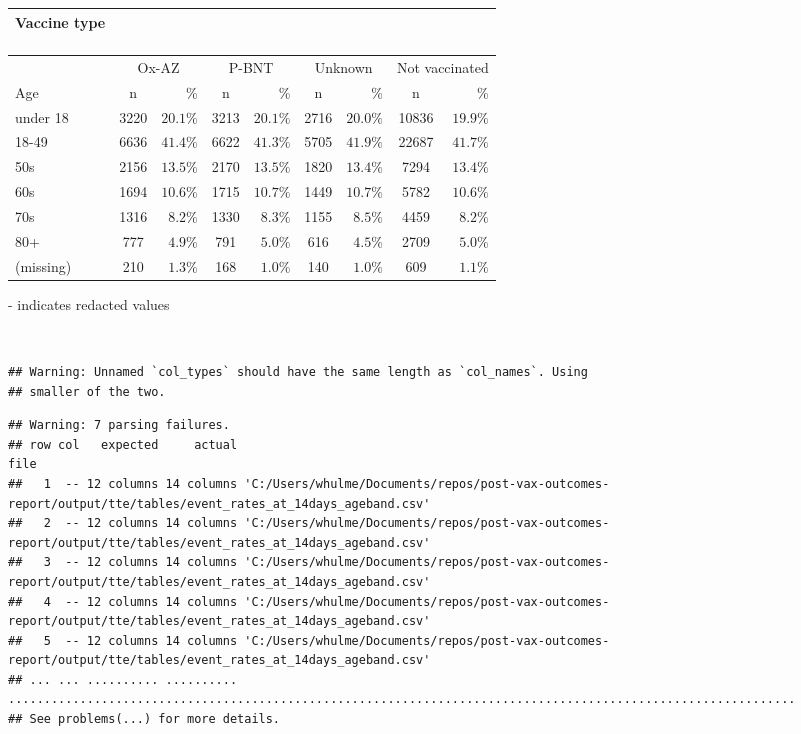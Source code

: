 \documentclass[
]{article}
\begin{document}
\captionsetup[table]{labelformat=empty,skip=1pt}
\begin{longtable}{lcrcrcrcr}
\caption*{
\large Vaccine type\\ 
\small \\ 
} \\ 
\toprule
& \multicolumn{2}{c}{Ox-AZ} & \multicolumn{2}{c}{P-BNT} & \multicolumn{2}{c}{Unknown} & \multicolumn{2}{c}{Not vaccinated} \\ 
 \cmidrule(lr){2-3}\cmidrule(lr){4-5}\cmidrule(lr){6-7}\cmidrule(lr){8-9}
Age & n & \% & n & \% & n & \% & n & \% \\ 
\midrule
under 18 & 3220 & $20.1\%$ & 3213 & $20.1\%$ & 2716 & $20.0\%$ & 10836 & $19.9\%$ \\ 
18-49 & 6636 & $41.4\%$ & 6622 & $41.3\%$ & 5705 & $41.9\%$ & 22687 & $41.7\%$ \\ 
50s & 2156 & $13.5\%$ & 2170 & $13.5\%$ & 1820 & $13.4\%$ & 7294 & $13.4\%$ \\ 
60s & 1694 & $10.6\%$ & 1715 & $10.7\%$ & 1449 & $10.7\%$ & 5782 & $10.6\%$ \\ 
70s & 1316 & $8.2\%$ & 1330 & $8.3\%$ & 1155 & $8.5\%$ & 4459 & $8.2\%$ \\ 
80+ & 777 & $4.9\%$ & 791 & $5.0\%$ & 616 & $4.5\%$ & 2709 & $5.0\%$ \\ 
(missing) & 210 & $1.3\%$ & 168 & $1.0\%$ & 140 & $1.0\%$ & 609 & $1.1\%$ \\ 
\bottomrule
\end{longtable}
\begin{minipage}{\linewidth}
- indicates redacted values\\ 
\end{minipage}

~ ~

\begin{verbatim}
## Warning: Unnamed `col_types` should have the same length as `col_names`. Using
## smaller of the two.
\end{verbatim}

\begin{verbatim}
## Warning: 7 parsing failures.
## row col   expected     actual                                                                                                           file
##   1  -- 12 columns 14 columns 'C:/Users/whulme/Documents/repos/post-vax-outcomes-report/output/tte/tables/event_rates_at_14days_ageband.csv'
##   2  -- 12 columns 14 columns 'C:/Users/whulme/Documents/repos/post-vax-outcomes-report/output/tte/tables/event_rates_at_14days_ageband.csv'
##   3  -- 12 columns 14 columns 'C:/Users/whulme/Documents/repos/post-vax-outcomes-report/output/tte/tables/event_rates_at_14days_ageband.csv'
##   4  -- 12 columns 14 columns 'C:/Users/whulme/Documents/repos/post-vax-outcomes-report/output/tte/tables/event_rates_at_14days_ageband.csv'
##   5  -- 12 columns 14 columns 'C:/Users/whulme/Documents/repos/post-vax-outcomes-report/output/tte/tables/event_rates_at_14days_ageband.csv'
## ... ... .......... .......... ..............................................................................................................
## See problems(...) for more details.
\end{verbatim}
\end{document}
